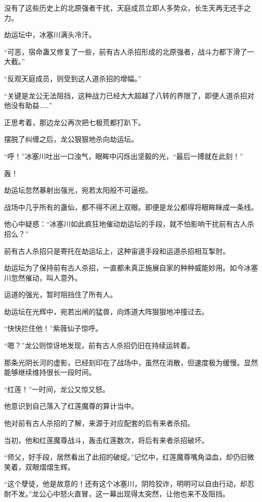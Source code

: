 \begin{this_body}
没有了这些历史上的北原强者干扰，天庭成员立即人多势众，长生天再无还手之力。

劫运坛中，冰塞川满头冷汗。

“可恶，宿命蛊又修复了一些，前有古人杀招形成的北原强者，战斗力都下滑了一大截。”

“反观天庭成员，则受到这人道杀招的增幅。”

“关键是龙公无法阻挡，这种战力已经大大超越了八转的界限了，即便人道杀招对他没有助益……”

正思考着，那边龙公再次把七极荒都打趴下。

摆脱了纠缠之后，龙公狠狠地杀向劫运坛。

“呼！”冰塞川吐出一口浊气，眼眸中闪烁出坚毅的光，“最后一搏就在此刻！”

轰！

劫运坛忽然暴射出强光，宛若太阳般不可逼视。

战场中几乎所有的蛊仙，都不得不闭上双眼。即便是龙公都得将眼眸眯成一条线。

他心中疑惑：“冰塞川如此疯狂地催动劫运坛的手段，就不怕影响干扰前有古人杀招么？”

前有古人杀招只是寄托在劫运坛上，这种宙道手段和运道杀招相互掣肘。

劫运坛为了保持前有古人杀招，一直都未真正施展自家的种种威能妙用。如今冰塞川忽然催动，叫人意外。

运道的强光，暂时阻挡住了所有人。

劫运坛在光辉中，宛若出闸的猛兽，向炼道大阵狠狠地冲撞过去。

“快快拦住他！”紫薇仙子惊呼。

“嗯？”龙公则惊讶地发现，前有古人杀招仍旧在持续运转着。

那条光阴长河的虚影，已经刻印在了战场中，虽然在消散，但速度极为缓慢。显然能够继续维持很长一段时间。

“红莲！”一时间，龙公又惊又怒。

他意识到自己落入了红莲魔尊的算计当中。

他对前有古人杀招的了解，来源于对应配套的后有来者杀招。

当初，他和红莲魔尊战斗，轰击红莲数次，将后有来者杀招破坏。

“师父，好手段，居然看出了此招的破绽。”记忆中，红莲魔尊嘴角溢血，却仍旧微笑着，双眼熠熠生辉。

“这个孽徒，他是故意的！还有这个冰塞川，阴险狡诈，明明可以自由行动，却忍耐不发。”龙公心中怒火直冒，这一幕出现得太突然，让他也来不及阻挡。


\end{this_body}
